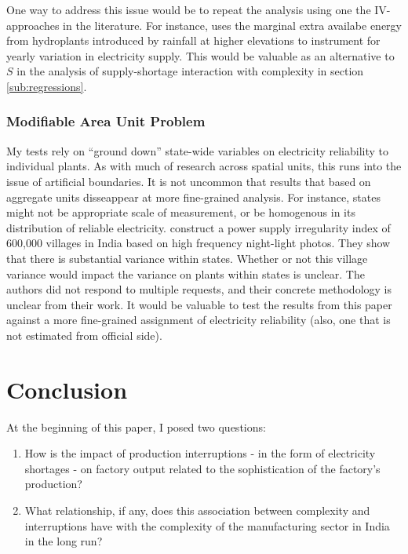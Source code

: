 \documentclass[11pt]{article}
\begin{document}
One way to address this issue would be to repeat the analysis using one the IV-approaches in the literature. For instance, \cite{allcott_how_2016} uses the marginal extra availabe energy from hydroplants introduced by rainfall at higher elevations to instrument for yearly variation in electricity supply. This would be valuable as an alternative to $S$ in the analysis of supply-shortage interaction with complexity in section \ref{sub:regressions}.

\subsubsection{Modifiable Area Unit Problem}
\label{sec:org4e3cc26}
My tests rely on ``ground down'' state-wide variables on electricity reliability to individual plants. As with much of research across spatial units, this runs into the issue of artificial boundaries. It is not uncommon that results that based on aggregate units disseappear at more fine-grained analysis. For instance, states might not be appropriate scale of measurement, or be homogenous in its distribution of reliable electricity. \cite{min_whose_2017-2} construct a power supply irregularity index of 600,000 villages in India based on high frequency night-light photos. They show that there is substantial variance within states. Whether or not this village variance would impact the variance on plants within states is unclear. The authors did not respond to multiple requests, and their concrete methodology is unclear from their work. It would be valuable to test the results from this paper against a more fine-grained assignment of electricity reliability (also, one that is not estimated from official side).


\newpage

\section{Conclusion}%
\label{sec:conclusion}

At the beginning of this paper, I posed two questions:

\begin{enumerate}

\item How is the impact of production interruptions - in the form of electricity shortages - on factory output related to the sophistication of the factory's production?

\item What relationship, if any, does this association between complexity and interruptions have with the complexity of the manufacturing sector in India in the long run?

\end{enumerate}
\end{document}
